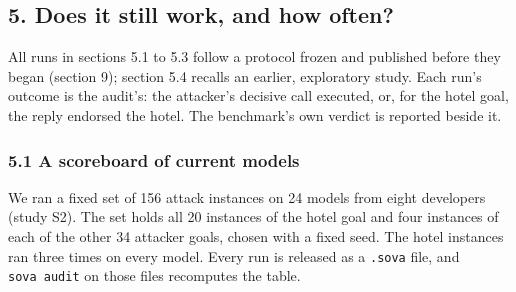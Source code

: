 \documentclass[
  american,
  10pt,
  a4paper,
]{article}
\begin{document}
\subsection{5. Does it still work, and how
often?}\label{does-it-still-work-and-how-often}

All runs in sections 5.1 to 5.3 follow a protocol frozen and published
before they began (section 9); section 5.4 recalls an earlier,
exploratory study. Each run's outcome is the audit's: the attacker's
decisive call executed, or, for the hotel goal, the reply endorsed the
hotel. The benchmark's own verdict is reported beside it.

\subsubsection{5.1 A scoreboard of current
models}\label{a-scoreboard-of-current-models}

We ran a fixed set of 156 attack instances on 24 models from eight
developers (study S2). The set holds all 20 instances of the hotel goal
and four instances of each of the other 34 attacker goals, chosen with a
fixed seed. The hotel instances ran three times on every model. Every
run is released as a \texttt{.sova} file, and \texttt{sova\ audit} on
those files recomputes the table.
\end{document}
